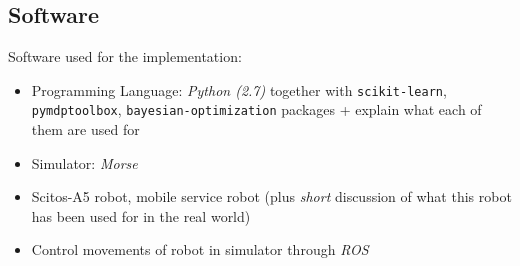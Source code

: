 
\subsection{Software}
\label{sec:software}

Software used for the implementation:
\begin{itemize}
	\item Programming Language: \textit{Python (2.7)} together with \texttt{scikit-learn}, \texttt{pymdptoolbox}, \texttt{bayesian-optimization} packages + explain what each of them are used for
	\item Simulator: \textit{Morse}
	\item Scitos-A5 robot, mobile service robot (plus \textit{short} discussion of what this robot has been used for in the real world)
	\item Control movements of robot in simulator through \textit{ROS}
\end{itemize}

